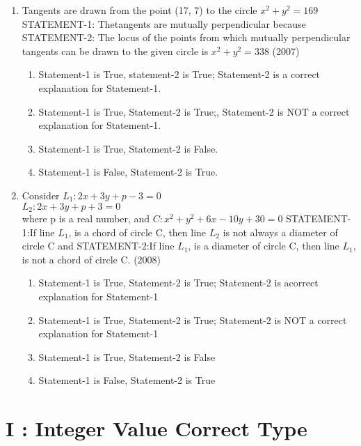 \documentclass[12pt]{article}
\begin{document}
\begin{enumerate}
\item Tangents are drawn from the point (17, 7) to the circle $x^2+y^2=169$
STATEMENT-1: Thetangents are mutually perpendicular because
STATEMENT-2: The locus of the points from which mutually perpendicular tangents can be drawn to the given circle is $x^2+y^2=338$ (2007)
\begin{enumerate}
\item Statement-1 is True, statement-2 is True; Statement-2 is a correct explanation for Statement-1.
\item Statement-1 is True, Statement-2 is True;, Statement-2 is NOT a correct explanation for Statement-1.
\item Statement-1 is True, Statement-2 is False.
\item  Statement-1 is False, Statement-2 is True.
\end{enumerate}
\item Consider $L_1:2x+3y+p-3=0$\\
$L_2:2x+3y+p+3=0$\\
where p is a real number, and $C:x^2+y^2+6x-10y+30=0$
STATEMENT-1:If line $L_1$, is a chord of circle C, then line $L_2$ is not always a diameter of circle C and 
STATEMENT-2:If line $L_1$, is a diameter of circle C, then line $L_1$, is not a chord of circle C. (2008)
\begin{enumerate}
\item Statement-1 is True, Statement-2 is True; Statement-2 is acorrect explanation for Statement-1
\item Statement-1 is True, Statement-2 is True; Statement-2 is NOT a correct explanation for Statement-1
\item Statement-1 is True, Statement-2 is False
\item Statement-1 is False, Statement-2 is True
\end{enumerate}
\end{enumerate}

\section*{I    : Integer Value Correct Type }
\end{document}
